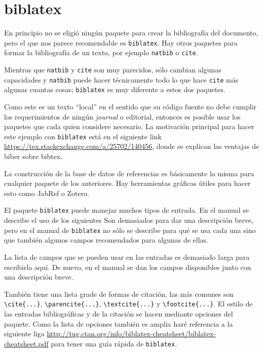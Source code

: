 \section{biblatex}%
\label{sec:bib}
En principio no se eligió ningún paquete para crear la bibliografía del documento, pero el que nos parece recomendable es \texttt{biblatex}. Hay otros paquetes para formar la bibliografía de un texto, por ejemplo
\texttt{natbib} o \texttt{cite}.

Mientras que \texttt{natbib} y \texttt{cite} son muy parecidos, sólo cambian
algunas capacidades y \texttt{natbib} puede hacer técnicamente todo lo que
hace \texttt{cite} más algunas cuantas cosas; \texttt{biblatex} es muy
diferente a estos dos paquetes.

Como este es un texto ``local'' en el sentido que su código fuente no debe
cumplir los requerimientos de ningún \textit{journal} o editorial, entonces
es posible usar los paquetes que cada quien considere necesario. La
motivación principal para hacer este ejemplo con \texttt{biblatex} está
en el siguiente link \url{https://tex.stackexchange.com/a/25702/140456},
donde se explican las ventajas de biber sobre bibtex.

La construcción de la base de datos de referencias es básicamente la misma
para cualquier paquete de los anteriores. Hay herramientas gráficas útiles
para hacer esto como JabRef o Zotero.

El paquete \texttt{biblatex} puede manejar muchos tipos de entrada. En el
manual se describe el uso de los siguientes
Son demasiados para dar una descripción breve, pero en el manual de
\texttt{biblatex} no sólo se describe para qué se usa cada una sino que
también algunos campos recomendados para algunas de ellas.

La lista de campos que se pueden usar en las entradas es demasiado larga para
escribirla aquí. De nuevo, en el manual se dan los campos disponibles junto
con una descripción breve.

También tiene una lista grade de formas de citación, las más comunes son
\verb|\cite{...}|, \verb|\parencite{...}|, \verb|\textcite{...}| y
\verb|\footcite{...}|. El estilo de las entradas bibliográficas y de la
citación se hacen mediante opciones del paquete. Como la lista de opciones
también es amplia haré referencia a la siguiente liga
\url{http://tug.ctan.org/info/biblatex-cheatsheet/biblatex-cheatsheet.pdf}
para tener una guía rápida de \texttt{biblatex}.

